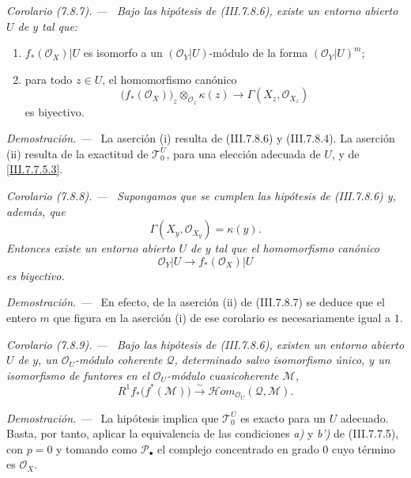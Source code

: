 \documentclass[10pt,oneside]{book}
\newcommand{\kres}{\kappa}
\newcommand{\sref}[2][]{\textup{(#2)}}
\newenvironment{corollary}[1][]{\par\medskip\noindent\itshape Corolario (#1). ---\ }{\par}
\newenvironment{proof}{\par\medskip\noindent\textit{Demostración. ---\ }}{\par}
\begin{document}
\begin{corollary}[7.8.7]
\label{III.7.8.7}
Bajo las hipótesis de \textup{\sref{III.7.8.6}}, existe un entorno abierto
$U$ de $y$ tal que:
\begin{enumerate}
  \item[\textup{(i)}] $f_*(\mathscr O_X)|U$ es isomorfo a un
    $(\mathscr O_Y|U)$-módulo de la forma $(\mathscr O_Y|U)^m$;
  \item[\textup{(ii)}] para todo $z\in U$, el homomorfismo canónico
    \[
      \bigl(f_*(\mathscr O_X)\bigr)_z
        \otimes_{\mathscr O_z}\kres(z)
      \longrightarrow
      \Gamma(X_z,\mathscr O_{X_z})
    \]
    es biyectivo.
\end{enumerate}
\end{corollary}

\begin{proof}
La aserción (i) resulta de \sref{III.7.8.6} y \sref{III.7.8.4}.
La aserción (ii) resulta de la exactitud de $\mathscr T_0^U$, para
una elección adecuada de $U$, y de \eqref{III.7.7.5.3}.
\end{proof}

\begin{corollary}[7.8.8]
\label{III.7.8.8}
Supongamos que se cumplen las hipótesis de \textup{\sref{III.7.8.6}} y,
además, que
\[
  \Gamma(X_y,\mathscr O_{X_y})=\kres(y).
\]
Entonces existe un entorno abierto $U$ de $y$ tal que el
homomorfismo canónico
\[
  \mathscr O_Y|U\longrightarrow f_*(\mathscr O_X)|U
\]
es biyectivo.
\end{corollary}

\begin{proof}
En efecto, de la aserción (ii) de \sref{III.7.8.7} se deduce que el
entero $m$ que figura en la aserción (i) de ese corolario es
necesariamente igual a $1$.
\end{proof}

\begin{corollary}[7.8.9]
\label{III.7.8.9}
Bajo las hipótesis de \textup{\sref{III.7.8.6}}, existen un entorno abierto
$U$ de $y$, un $\mathscr O_U$-módulo coherente $\mathscr Q$,
determinado salvo isomorfismo único, y un isomorfismo de funtores en
el $\mathscr O_U$-módulo cuasicoherente $\mathscr M$,
\[
  R^1f_*\bigl(f^*(\mathscr M)\bigr)
  \xrightarrow{\sim}
  \mathscr Hom_{\mathscr O_U}(\mathscr Q,\mathscr M).
  \tag{7.8.9.1}\label{III.7.8.9.1}
\]
\end{corollary}

\begin{proof}
La hipótesis implica que $\mathscr T_0^U$ es exacto para un $U$
adecuado. Basta, por tanto, aplicar la equivalencia de las
condiciones \emph{a)} y \emph{b')} de \sref{III.7.7.5}, con $p=0$ y tomando como
$\mathscr P_\bullet$ el complejo concentrado en grado $0$ cuyo
término es $\mathscr O_X$.
\end{proof}
\end{document}
